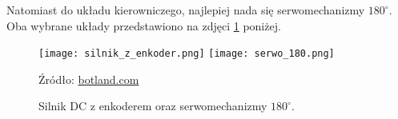             Natomiast do układu kierowniczego, najlepiej nada się serwomechanizmy $180^\circ$. Oba wybrane układy przedstawiono na zdjęci \ref{fig:engines} poniżej.
            \begin{figure}[!ht]
                \centering
                \texttt{[image: silnik\_z\_enkoder.png]}
                \texttt{[image: serwo\_180.png]}
                
                \caption{Silnik DC z enkoderem oraz serwomechanizmy $180^\circ$.}
                \footnotesize{Źródło: \href{https://botland.com.pl/}{botland.com}}
                \label{fig:engines}
            \end{figure}
        
